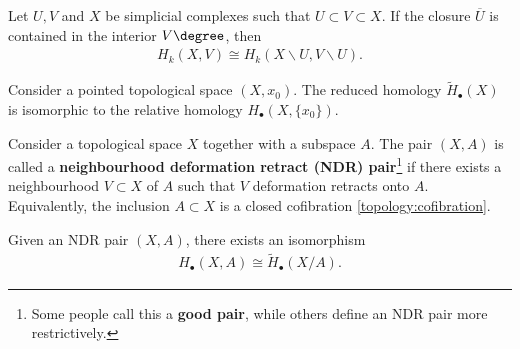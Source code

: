     \begin{theorem}\label{topology:excision_theorem}
        Let $U,V$ and $X$ be simplicial complexes such that $U\subset V\subset X$. If the closure $\overline{U}$ is contained in the interior $V\degree$, then
        \begin{gather}
            H_k(X,V) \cong H_k(X\backslash U,V\backslash U).
        \end{gather}
    \end{theorem}

    \begin{property}
        Consider a pointed topological space $(X,x_0)$. The reduced homology $\widetilde{H}_\bullet(X)$ is isomorphic to the relative homology $H_\bullet(X,\{x_0\})$.
    \end{property}

    \begin{property}\label{topology:ndr_pair_homology}
        Consider a topological space $X$ together with a subspace $A$. The pair $(X,A)$ is called a \textbf{neighbourhood deformation retract (NDR) pair}\footnote{Some people call this a \textbf{good pair}, while others define an NDR pair more restrictively.} if there exists a neighbourhood $V\subset X$ of $A$ such that $V$ deformation retracts onto $A$. Equivalently, the inclusion $A\subset X$ is a closed cofibration \ref{topology:cofibration}.

        Given an NDR pair $(X,A)$, there exists an isomorphism
        \begin{gather}
            H_\bullet(X,A)\cong\widetilde{H}_\bullet(X/A).
        \end{gather}
    \end{property}

